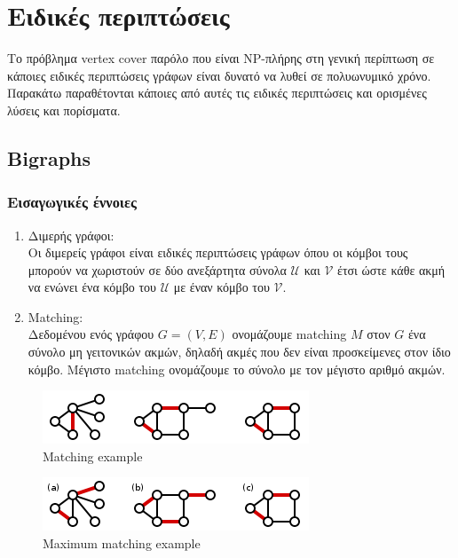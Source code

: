 
\chapter{Ειδικές περιπτώσεις} %

\label{Chapter3} %
Το πρόβλημα vertex cover παρόλο που είναι NP-πλήρης στη γενική περίπτωση σε κάποιες ειδικές περιπτώσεις γράφων είναι δυνατό να λυθεί σε πολυωνυμικό χρόνο. Παρακάτω παραθέτονται κάποιες από αυτές τις ειδικές περιπτώσεις και ορισμένες λύσεις και πορίσματα.

\section{Bigraphs}

\subsection{Εισαγωγικές έννοιες}

\begin{enumerate}
\item
Διμερής γράφοι:\\
Οι διμερείς γράφοι είναι ειδικές περιπτώσεις γράφων όπου οι κόμβοι τους μπορούν να χωριστούν σε δύο ανεξάρτητα σύνολα $\mathcal{U}$ και $\mathcal{V}$ έτσι ώστε κάθε ακμή να ενώνει ένα κόμβο του $\mathcal{U}$ με έναν κόμβο του $\mathcal{V}$. 
\item
Matching:\\
Δεδομένου ενός γράφου $G=(V,E)$ ονομάζουμε matching $Μ$ στον $G$ ένα σύνολο μη γειτονικών ακμών, δηλαδή ακμές που δεν είναι προσκείμενες στον ίδιο κόμβο. Μέγιστο matching ονομάζουμε το σύνολο με τον μέγιστο αριθμό ακμών.
\end{enumerate}
\begin{figure}[H]
\caption{Matching example}
\centering
\includegraphics{Figures/match.png}\centering
\end{figure}

\begin{figure}[H]
\caption{Maximum matching example}
\centering
\includegraphics{Figures/max_match.png}\centering
\end{figure}

